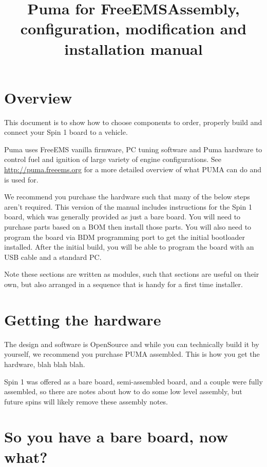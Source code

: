 \documentclass[12pt,a4paper,titlepage]{article}
\author{}
\title{Puma for FreeEMS\newline Assembly, configuration, modification and installation manual}
\begin{document}
\maketitle
\pagebreak

\tableofcontents
\thispagestyle{empty}
\pagebreak

\section{Overview}

This document is to show how to choose components to order, properly build and connect your Spin 1 board to a vehicle.

Puma uses FreeEMS vanilla firmware, PC tuning software and Puma hardware to control fuel and ignition of large variety of engine configurations. See \url{http://puma.freeems.org} for a more detailed overview of what PUMA can do and is used for.

We recommend you purchase the hardware such that many of the below steps aren't required. This version of the manual includes instructions for the Spin 1 board, which was generally provided as just a bare board. You will need to purchase parts based on a BOM then install those parts. You will also need to program the board via BDM programming port to get the initial bootloader installed. After the initial build, you will be able to program the board with an USB cable and a standard PC.

Note these sections are written as modules, such that sections are useful on their own, but also arranged in a sequence that is handy for a first time installer.

\section{Getting the hardware}

The design and software is OpenSource and while you can technically build it by yourself, we recommend you purchase PUMA assembled. This is how you get the hardware, blah blah blah.

Spin 1 was offered as a bare board, semi-assembled board, and a couple were fully assembled, so there are notes about how to do some low level assembly, but future spins will likely remove these assembly notes.

\section{So you have a bare board, now what?}
\end{document}
